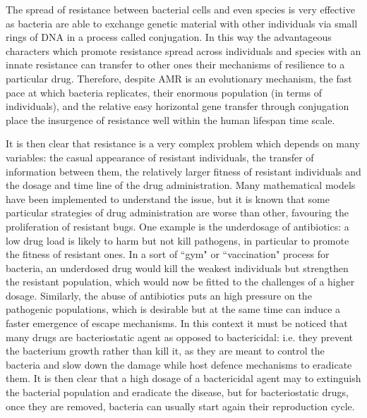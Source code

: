 \documentclass[a4paper,11pt]{extreport}
\begin{document}
The spread of resistance between bacterial cells and even species is very effective as bacteria are able to exchange genetic material with other individuals via small rings of DNA in a process called conjugation.\cite{????} In this way the advantageous characters which promote resistance spread across individuals and species with an innate resistance can transfer to other ones their mechanisms of resilience to a particular drug.
%
Therefore, despite AMR is an evolutionary mechanism, the fast pace at which bacteria replicates, their enormous population (in terms of individuals), and the relative easy horizontal gene transfer through conjugation place the insurgence of resistance well within the human lifespan time scale.\cite{????}

It is then clear that resistance is a very complex problem which depends on many variables: the casual appearance of resistant individuals, the transfer of information between them, the relatively larger fitness of resistant individuals and the dosage and time line of the drug administration. Many mathematical models have been implemented to understand the issue\cite{Birkegard2018,Niewiadomska2019}, but it is known that some particular strategies of drug administration are worse than other, favouring the proliferation of resistant bugs.
%
One example is the underdosage of antibiotics: a low drug load is likely to harm but not kill pathogens, in particular to promote the fitness of resistant ones. In a sort of ``gym" or ``vaccination" process for bacteria, an underdosed drug would kill the weakest individuals but strengthen the resistant population, which would now be fitted to the challenges of a higher dosage.\cite{????}
%
Similarly, the abuse of antibiotics puts an high pressure on the pathogenic populations, which is desirable but at the same time can induce a faster emergence of escape mechanisms.\cite{????}
%
In this context it must be noticed that many drugs are bacteriostatic agent as opposed to bactericidal: i.e. they prevent the bacterium growth rather than kill it, as they are meant to control the bacteria and slow down the damage while host defence mechanisms to eradicate them.
%
It is then clear that a high dosage of a bactericidal agent may to extinguish the bacterial population and eradicate the disease, but for bacteriostatic drugs, once they are removed, bacteria can usually start again their reproduction cycle.
\end{document}
